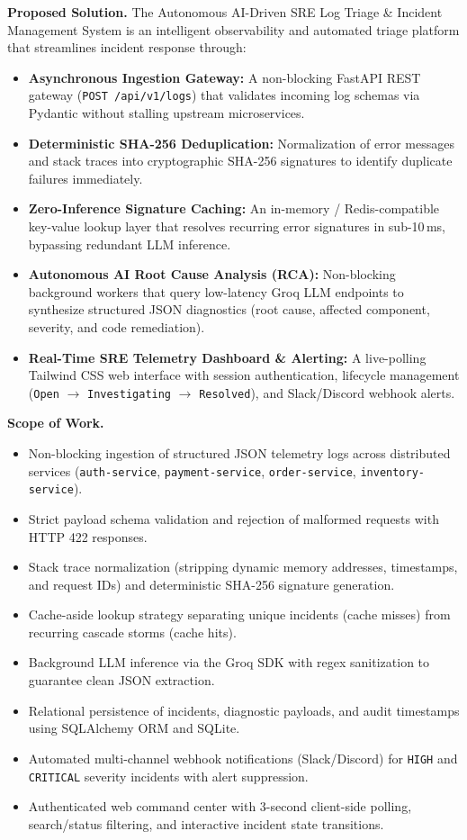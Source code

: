 \documentclass[12pt,a4paper,oneside]{report}
\begin{document}
\textbf{Proposed Solution.} The Autonomous AI-Driven SRE Log Triage \& Incident Management System is an intelligent observability and automated triage platform that streamlines incident response through:
\begin{itemize}
  \item \textbf{Asynchronous Ingestion Gateway:} A non-blocking FastAPI REST gateway (\texttt{POST /api/v1/logs}) that validates incoming log schemas via Pydantic without stalling upstream microservices.
  \item \textbf{Deterministic SHA-256 Deduplication:} Normalization of error messages and stack traces into cryptographic SHA-256 signatures to identify duplicate failures immediately.
  \item \textbf{Zero-Inference Signature Caching:} An in-memory / Redis-compatible key-value lookup layer that resolves recurring error signatures in sub-10\,ms, bypassing redundant LLM inference.
  \item \textbf{Autonomous AI Root Cause Analysis (RCA):} Non-blocking background workers that query low-latency Groq LLM endpoints to synthesize structured JSON diagnostics (root cause, affected component, severity, and code remediation).
  \item \textbf{Real-Time SRE Telemetry Dashboard \& Alerting:} A live-polling Tailwind CSS web interface with session authentication, lifecycle management (\texttt{Open} $\rightarrow$ \texttt{Investigating} $\rightarrow$ \texttt{Resolved}), and Slack/Discord webhook alerts.
\end{itemize}

\textbf{Scope of Work.}
\begin{itemize}
  \item Non-blocking ingestion of structured JSON telemetry logs across distributed services (\texttt{auth-service}, \texttt{payment-service}, \texttt{order-service}, \texttt{inventory-service}).
  \item Strict payload schema validation and rejection of malformed requests with HTTP 422 responses.
  \item Stack trace normalization (stripping dynamic memory addresses, timestamps, and request IDs) and deterministic SHA-256 signature generation.
  \item Cache-aside lookup strategy separating unique incidents (cache misses) from recurring cascade storms (cache hits).
  \item Background LLM inference via the Groq SDK with regex sanitization to guarantee clean JSON extraction.
  \item Relational persistence of incidents, diagnostic payloads, and audit timestamps using SQLAlchemy ORM and SQLite.
  \item Automated multi-channel webhook notifications (Slack/Discord) for \texttt{HIGH} and \texttt{CRITICAL} severity incidents with alert suppression.
  \item Authenticated web command center with 3-second client-side polling, search/status filtering, and interactive incident state transitions.
\end{itemize}
\end{document}
